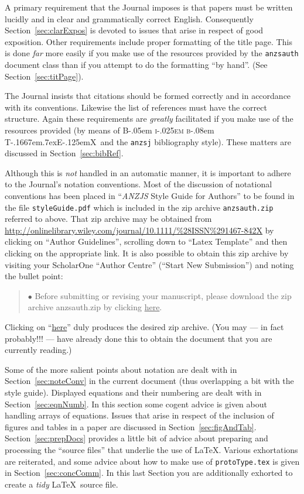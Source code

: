 \documentclass[times, doublespace]{anzsauth}
\newcommand\BibTeX{{\rmfamily B\kern-.05em \textsc{i\kern-.025em b}\kern-.08em
T\kern-.1667em\lower.7ex\hbox{E}\kern-.125emX}}
\begin{document}
A primary requirement that the Journal imposes is that papers must
be written lucidly and in clear and grammatically correct English.
Consequently Section~\ref{sec:clarExpos} is devoted to issues that
arise in respect of good exposition.  Other requirements include
proper formatting of the title page.  This is done \emph{far}
more easily if you make use of the resources provided by the
\texttt{anzsauth} document class than if you attempt to do the
formatting ``by hand''.  (See Section~\ref{sec:titPage}).

The Journal insists that citations should be formed correctly and in
accordance with its conventions.  Likewise the list of references
must have the correct structure.  Again these requirements are
\emph{greatly} facilitated if you make use of the resources provided
(by means of \BibTeX\ and the \texttt{anzsj} bibliography style).
These matters are discussed in Section~\ref{sec:bibRef}.

Although this is \emph{not} handled in an automatic manner,
it is important to adhere to the Journal's notation conventions.
Most of the discussion of notational conventions has been placed in
``{\textit{ANZJS} Style Guide for Authors}'' to be found in the
file \texttt{styleGuide.pdf} which is included in the zip archive
\texttt{anzsauth.zip} referred to above.  That zip archive may be
obtained from\\
{\small
\url{http://onlinelibrary.wiley.com/journal/10.1111/%28ISSN%291467-842X}
}
\noindent
by clicking on ``Author Guidelines'', scrolling down to ``Latex
Template'' and then clicking on the appropriate link.  It is also
possible to obtain this zip archive by visiting your ScholarOne
``Author Centre'' (``Start New Submission'') and noting the bullet
point:
\begin{quote}
$\bullet$ Before submitting or revising your manuscript, please
download the zip archive anzsauth.zip by clicking \underline{here}.
\end{quote}
Clicking on ``\underline{here}'' duly produces the desired zip
archive.  (You may --- in fact probably!!! --- have already done
this to obtain the document that you are currently reading.)

Some of the more salient points about notation are dealt with in
Section~\ref{sec:noteConv} in the current document (thus overlapping
a bit with the style guide).  Displayed equations and their numbering
are dealt with in Section~\ref{sec:eqnNumb}.  In this section
some cogent advice is given about handling arrays of equations.
Issues that arise in respect of the inclusion of figures and
tables in a paper are discussed in Section~\ref{sec:figAndTab}.
Section~\ref{sec:prepDocs} provides a little bit of advice about
preparing and processing the ``source files'' that underlie the
use of \LaTeX.  Various exhortations are reiterated, and some
advice about how to make use of \texttt{protoType.tex} is given
in Section~\ref{sec:concComm}.  In this last Section you are
additionally exhorted to create a \emph{tidy} \LaTeX\ source file.
\end{document}
